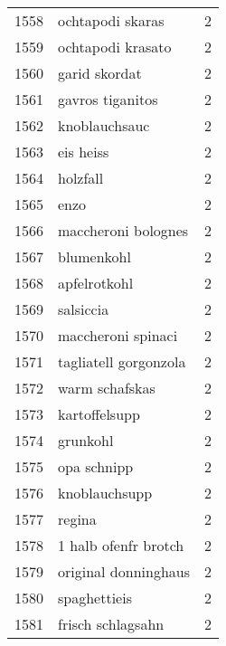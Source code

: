 \begin{tabular}{llr}
1558 &                                   ochtapodi skaras &      2 \\
1559 &                                  ochtapodi krasato &      2 \\
1560 &                                      garid skordat &      2 \\
1561 &                                   gavros tiganitos &      2 \\
1562 &                                      knoblauchsauc &      2 \\
1563 &                                          eis heiss &      2 \\
1564 &                                           holzfall &      2 \\
1565 &                                               enzo &      2 \\
1566 &                                maccheroni bolognes &      2 \\
1567 &                                         blumenkohl &      2 \\
1568 &                                       apfelrotkohl &      2 \\
1569 &                                          salsiccia &      2 \\
1570 &                                 maccheroni spinaci &      2 \\
1571 &                              tagliatell gorgonzola &      2 \\
1572 &                                     warm schafskas &      2 \\
1573 &                                      kartoffelsupp &      2 \\
1574 &                                           grunkohl &      2 \\
1575 &                                        opa schnipp &      2 \\
1576 &                                      knoblauchsupp &      2 \\
1577 &                                             regina &      2 \\
1578 &                               1 halb ofenfr brotch &      2 \\
1579 &                               original donninghaus &      2 \\
1580 &                                       spaghettieis &      2 \\
1581 &                                  frisch schlagsahn &      2 \\

\end{tabular}
